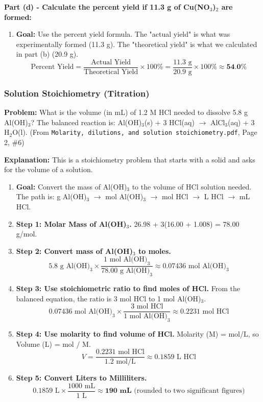 \documentclass{article}
\begin{document}
\textbf{Part (d) - Calculate the percent yield if 11.3 g of Cu(NO\(_3\))\(_2\) are formed:}
\begin{enumerate}[itemsep=5pt]
    \item \textbf{Goal:} Use the percent yield formula. The "actual yield" is what was experimentally formed (11.3 g). The "theoretical yield" is what we calculated in part (b) (20.9 g).
    \[ \text{Percent Yield} = \frac{\text{Actual Yield}}{\text{Theoretical Yield}} \times 100\% = \frac{11.3 \text{ g}}{20.9 \text{ g}} \times 100\% \approx \textbf{54.0\%} \]
\end{enumerate}

\bigskip
\subsubsection*{Solution Stoichiometry (Titration)}
\textbf{Problem:} What is the volume (in mL) of 1.2 M HCl needed to dissolve 5.8 g Al(OH)\(_3\)? The balanced reaction is: Al(OH)\(_3\)(s) + 3 HCl(aq) \(\rightarrow\) AlCl\(_3\)(aq) + 3 H\(_2\)O(l). (From \texttt{Molarity, dilutions, and solution stoichiometry.pdf}, Page 2, \#6)

\textbf{Explanation:} This is a stoichiometry problem that starts with a solid and asks for the volume of a solution.
\begin{enumerate}[itemsep=5pt]
    \item \textbf{Goal:} Convert the mass of Al(OH)\(_3\) to the volume of HCl solution needed. The path is: g Al(OH)\(_3\) \(\rightarrow\) mol Al(OH)\(_3\) \(\rightarrow\) mol HCl \(\rightarrow\) L HCl \(\rightarrow\) mL HCl.
    \item \textbf{Step 1: Molar Mass of Al(OH)\(_3\).} 26.98 + 3(16.00 + 1.008) = 78.00 g/mol.
    \item \textbf{Step 2: Convert mass of Al(OH)\(_3\) to moles.}
    \[ 5.8 \text{ g Al(OH)}_3 \times \frac{1 \text{ mol Al(OH)}_3}{78.00 \text{ g Al(OH)}_3} \approx 0.07436 \text{ mol Al(OH)}_3 \]
    \item \textbf{Step 3: Use stoichiometric ratio to find moles of HCl.} From the balanced equation, the ratio is 3 mol HCl to 1 mol Al(OH)\(_3\).
    \[ 0.07436 \text{ mol Al(OH)}_3 \times \frac{3 \text{ mol HCl}}{1 \text{ mol Al(OH)}_3} \approx 0.2231 \text{ mol HCl} \]
    \item \textbf{Step 4: Use molarity to find volume of HCl.} Molarity (M) = mol/L, so Volume (L) = mol / M.
    \[ V = \frac{0.2231 \text{ mol HCl}}{1.2 \text{ mol/L}} \approx 0.1859 \text{ L HCl} \]
    \item \textbf{Step 5: Convert Liters to Milliliters.}
    \[ 0.1859 \text{ L} \times \frac{1000 \text{ mL}}{1 \text{ L}} \approx \textbf{190 mL} \text{ (rounded to two significant figures)} \]
\end{enumerate}
\end{document}
